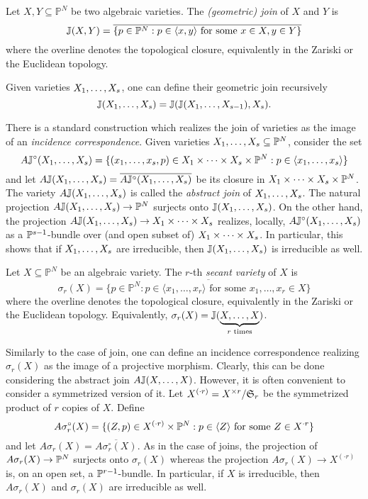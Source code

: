 \begin{definition}
\label{classicalAG-definition-join}
Let $X,Y \subseteq \mathbb{P}^N$ be two algebraic varieties. The {\it (geometric) join} of $X$ and $Y$ is 
\[
\mathbb{J}(X,Y) =  \overline{ \{ p \in \mathbb{P}^N : p \in \langle x , y \rangle \text{ for some $x \in X, y \in Y$}\}}
\]
where the overline denotes the topological closure, equivalently in the Zariski or the Euclidean topology.

Given varieties $X_1 , \ldots , X_s$, one can define their geometric join recursively
\[
\mathbb{J}( X_1 , \ldots , X_s) = \mathbb{J}( \mathbb{J}(X_1 , \ldots , X_{s-1}), X_s).
\]
\end{definition}
There is a standard construction which realizes the join of varieties as the image of an \emph{incidence correspondence}. Given varieties $X_1 , \ldots , X_s \subseteq \mathbb{P}^N$, consider the set
\[
A\mathbb{J}^\circ(X_1 , \ldots , X_s) = \{ (x_1 , \ldots , x_s, p) \in X_1 \times \cdots \times X_s \times \mathbb{P}^N : p \in \langle x_1 , \ldots , x_s\rangle\}
\]
and let $A\mathbb{J}(X_1 , \ldots , X_s) = \overline{A\mathbb{J}^\circ(X_1 , \ldots , X_s)}$ be its closure in $X_1 \times \cdots \times X_s \times \mathbb{P}^N$. The variety $A\mathbb{J}(X_1 , \ldots , X_s)$ is called the \emph{abstract join} of $X_1 , \ldots , X_s$. The natural projection $A\mathbb{J}(X_1 , \ldots , X_s)  \to \mathbb{P}^N$ surjects onto $\mathbb{J}(X_1 , \ldots , X_s)$. On the other hand, the projection $A\mathbb{J}(X_1 , \ldots , X_s) \to X_1 \times \cdots \times X_s$ realizes, locally, $A\mathbb{J}^\circ(X_1 , \ldots , X_s)$ as a $\mathbb{P}^{s-1}$-bundle over (and open subset of) $X_1 \times \cdots \times X_s$. In particular, this shows that if $X_1 , \ldots , X_s$ are irreducible, then $\mathbb{J}(X_1 , \ldots , X_s)$ is irreducible as well.


\begin{definition}
\label{classicalAG-definition-secantvariety}
Let $X \subseteq \mathbb{P}^N$ be an algebraic variety. The $r$-th {\it secant variety} of $X$ is 
\[
\sigma_r(X) = \overline{\{ p \in \mathbb{P}^N : p \in \langle x_1 , \ldots ,  x_r \rangle \text{ for some $x_1 , \ldots , x_r \in X$}
\}}
\]
where the overline denotes the topological closure, equivalently in the Zariski or the Euclidean topology. Equivalently, $\sigma_r(X) = \mathbb{J}(\underbrace{X , \ldots , X}_{r \text{ times}})$.
\end{definition}

Similarly to the case of join, one can define an incidence correspondence realizing $\sigma_r(X)$ as the image of a projective morphism. Clearly, this can be done considering the abstract join $A\mathbb{J}( X , \ldots , X)$. However, it is often convenient to consider a symmetrized version of it. Let $X^{(\cdot r)} = X^{\times r} /\mathfrak{S}_r$ be the symmetrized product of $r$ copies of $X$. Define 
\[
A\sigma^\circ_r(X) = \{ (Z , p  ) \in X^{(\cdot r)} \times \mathbb{P}^N : p \in \langle Z \rangle \text{ for some } Z \in X^{\cdot r}\}
\]
and let $A\sigma_r(X) = \overline{ A \sigma^\circ_r(X)}$. As in the case of joins, the projection of $A\sigma_r(X) \to \mathbb{P}^N$ surjects onto $\sigma_r(X)$ whereas the projection $A\sigma_r(X) \to X^{(\cdot r)}$ is, on an open set, a $\mathbb{P}^{r-1}$-bundle. In particular, if $X$ is irreducible, then $A\sigma_r(X)$ and $\sigma_r(X)$ are irreducible as well.

